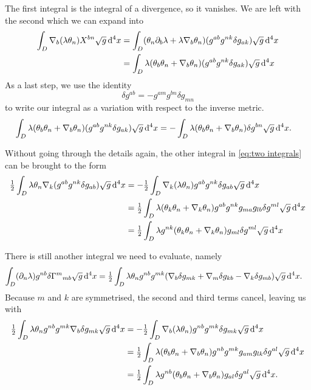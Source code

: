 \documentclass[../main.tex]{subfiles}
\begin{document}
The first integral is the integral of a divergence, so it vanishes. We are left with the
second which we can expand into
\begin{align*}
	\int_D \nabla_b(\lambda \theta_n) X^{bn}\sqrt{g}\,\mathrm{d}^4 x 
	& = \int_D (\theta_n \partial_b \lambda + \lambda \nabla_b\theta_n)(g^{ab}g^{nk}\delta
	g_{ak})\sqrt{g} \,\mathrm{d}^4 x \\
	& = \int_D \lambda(\theta_b\theta_n +
	\nabla_b\theta_n)(g^{ab}g^{nk}\delta g_{ak})\sqrt{g}\,\mathrm{d}^4 x
\end{align*}
As a last step, we use the identity
\begin{equation*}
	\delta g^{ab} = - g^{am}g^{bn} \delta g_{mn}
\end{equation*}
to write our integral as a variation with respect to the inverse metric.
\begin{align*}
	\int_D \lambda(\theta_b\theta_n + \nabla_b\theta_n)(g^{ab}g^{nk}\delta
	g_{ak})\sqrt{g}\,\mathrm{d}^4 x 
	& = -\int_D \lambda(\theta_b\theta_n + \nabla_b \theta_n)\delta g^{bn} \sqrt{g} \,\mathrm{d}^4 x. 
\end{align*}

Without going through the details again, the other integral in \cref{eq:two integrals} can
be brought to the form
\begin{align*} 
	\tfrac{1}{2} \int_D \lambda \theta_n \nabla_k (g^{ab}g^{nk}\delta g_{ab}) \sqrt{g} \,\mathrm{d}^4
	x 
	& = - \tfrac{1}{2} \int_D \nabla_k(\lambda \theta_n) g^{ab}g^{nk}\delta g_{ab} \sqrt{g}
	\,\mathrm{d}^4 x \\
	& = \tfrac{1}{2} \int_D \lambda(\theta_k\theta_n + \nabla_k\theta_n) g^{ab}g^{nk}
	g_{ma}g_{lb}\delta g^{ml} \sqrt{g}\,\mathrm{d}^4 x \\
	& = \tfrac{1}{2}\int_D \lambda g^{nk}(\theta_k\theta_n + \nabla_k \theta_n)g_{ml} \delta
	g^{ml} \sqrt{g} \,\mathrm{d}^4 x
\end{align*}

There is still another integral we need to evaluate, namely
\begin{align}
	\int_D (\partial_n \lambda) g^{nb}\delta{\Gamma^m}_{mb} \sqrt{g} \,\mathrm{d}^4 x 
	& = \tfrac{1}{2} \int_D \lambda \theta_n g^{nb} g^{mk}(\nabla_b \delta g_{mk} + \nabla_m
	\delta g_{kb} - \nabla_k \delta g_{mb}) \sqrt{g} \,\mathrm{d}^4 x. 
\end{align}
Because \( m \) and \( k \) are symmetrised, the second and third terms cancel, leaving
us with
\begin{align}
	\tfrac{1}{2}\int_D \lambda \theta_n g^{nb}g^{mk}\nabla_b \delta g_{mk} \sqrt{g} \,\mathrm{d}^4 x
	& = - \tfrac{1}{2} \int_D \nabla_b(\lambda \theta_n) g^{nb}g^{mk} \delta g_{mk} \sqrt{g}
	\,\mathrm{d}^4 x \\
	& = \tfrac{1}{2} \int_D \lambda(\theta_b\theta_n + \nabla_b
	\theta_n)g^{nb}g^{mk}g_{am}g_{lk}\delta g^{al} \sqrt{g} \,\mathrm{d}^4 x \\
	& = \tfrac{1}{2} \int_D \lambda g^{nb}(\theta_b \theta_n + \nabla_b \theta_n)
	g_{al} \delta g^{al} \sqrt{g} \,\mathrm{d}^4 x. 
\end{align}
\end{document}
